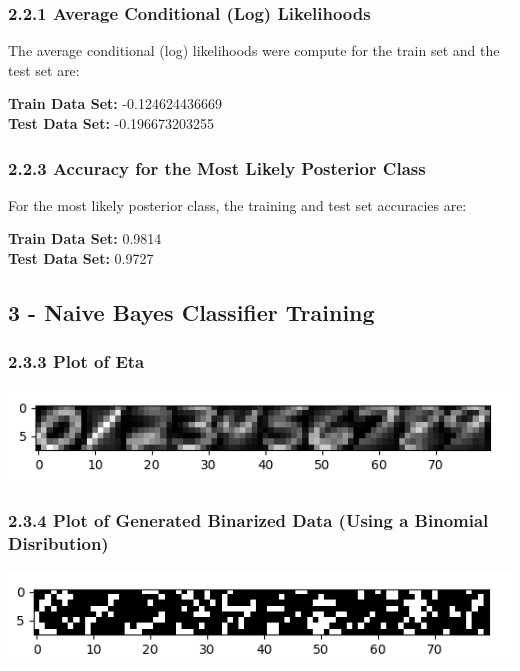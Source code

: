 \documentclass[10pt]{article}
\begin{document}
\subsubsection{2.2.1 Average Conditional (Log) Likelihoods}

The average conditional (log) likelihoods were compute for the train set and the test set are:
\begin{center}
\textbf{Train Data Set: } -0.124624436669
\\
\textbf{Test Data Set: } -0.196673203255
\end{center}

\subsubsection{2.2.3 Accuracy for the Most Likely Posterior Class}

For the most likely posterior class, the training and test set accuracies are: 
\begin{center}
\textbf{Train Data Set: } 0.9814
\\
\textbf{Test Data Set: } 0.9727
\end{center}


\subsection{3 -   Naive Bayes Classifier Training}

\subsubsection{2.3.3 Plot of Eta}

\begin{center}
\includegraphics[scale=1]{q2_3_1.png}
\end{center}

\subsubsection{2.3.4 Plot of Generated Binarized Data (Using a Binomial Disribution)}
\begin{center}
\includegraphics[scale=1]{q2_3_1_binomial.png}
\end{center}
\end{document}
